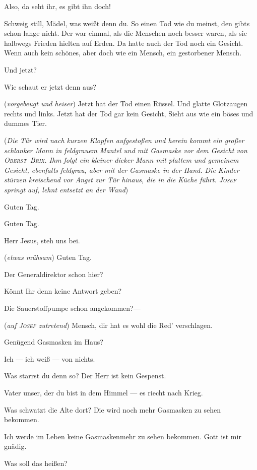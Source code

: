 \documentclass[
	final,
	a4paper,
	ngerman,
	mpinclude = true, %
	twoside = true,
	open = right,
	cleardoublepage = plain,
	DIV = 13,
	BCOR = 1cm,
	titlepage = firstiscover,
	]{scrbook}
\newcommand{\direction}[1]{(\textit{#1})}
\newcommand{\thecharacter}[1]{\textup{\textsc{#1}}\xspace}
\newcommand{\theJosef}{\thecharacter{Josef}}
\newcommand{\theKathrine}{\thecharacter{Kathrine}}
\newcommand{\theBrix}{\thecharacter{Oberst~Brix}}
\newcommand{\theMelchior}{\thecharacter{Melchior}}
\newcommand{\character}[1]{\item[#1]}
\newcommand{\Josef}{\character{\theJosef}}
\newcommand{\Kathrine}{\character{\theKathrine}}
\newcommand{\Brix}{\character{\theBrix}}
\newcommand{\Melchior}{\character{\theMelchior}}
\newcommand{\Junge}[1]{\character{Junge #1}}
\newcommand{\Maedchen}[1]{\character{Mädchen #1}}
\begin{document}
\begin{play}
\Maedchen{3}
Also, da seht ihr, es gibt ihn doch!

\Kathrine
Schweig still, Mädel, was weißt denn du. So einen Tod wie du meinst, den gibts schon lange nicht. Der war einmal, als die Menschen noch besser waren, als sie halbwegs Frieden hielten auf Erden. Da hatte auch der Tod noch ein Gesicht. Wenn auch kein schönes, aber doch wie ein Mensch, ein gestorbener Mensch.

\Junge{1}
Und jetzt?

\Maedchen{4}
Wie schaut er jetzt denn aus?

\Kathrine
\direction{vorgebeugt und heiser} Jetzt hat der Tod einen Rüssel. Und glatte Glotzaugen rechts und links. Jetzt hat der Tod gar kein Gesicht, Sieht aus wie ein böses und dummes Tier.

\direction{Die Tür wird nach kurzen Klopfen aufgestoßen und herein kommt ein großer schlanker Mann in feldgrauem Mantel und mit Gasmaske vor dem Gesicht von \theBrix. Ihm folgt ein kleiner dicker Mann mit plattem und gemeinem Gesicht, ebenfalls feldgrau, aber mit der Gasmaske in der Hand. Die Kinder stürzen kreischend vor Angst zur Tür hinaus, die in die Küche führt. \theJosef springt auf, lehnt entsetzt an der Wand}

\Melchior
Guten Tag.

\Brix
Guten Tag.

\Kathrine
Herr Jesus, steh uns bei.

\Josef
\direction{etwas mühsam} Guten Tag.

\Brix
Der Generaldirektor schon hier?

\Melchior
Könnt Ihr denn keine Antwort geben?

\Brix
Die Sauerstoffpumpe schon angekommen?---

\Melchior
\direction{auf \theJosef zutretend} Mensch, dir hat es wohl die Red' verschlagen.

\Brix
Genügend Gasmasken im Haus?

\Josef
Ich --- ich weiß --- von nichts.

\Melchior
Was starrst du denn so? Der Herr ist kein Gespenst.

\Kathrine
Vater unser, der du bist in dem Himmel --- es riecht nach Krieg.

\Melchior
Was schwatzt die Alte dort? Die wird noch mehr Gasmasken zu sehen bekommen.

\Kathrine
Ich werde im Leben keine Gasmaskenmehr zu sehen bekommen. Gott ist mir gnädig.

\Brix
Was soll das heißen?


\end{play}
\end{document}
